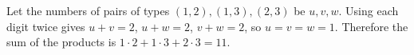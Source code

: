 Let the numbers of pairs of types $(1,2),(1,3),(2,3)$ be $u,v,w$. Using each digit twice gives $u+v=2$, $u+w=2$, $v+w=2$, so $u=v=w=1$. Therefore the sum of the products is $1\cdot2+1\cdot3+2\cdot3=\boxed{11}$.
